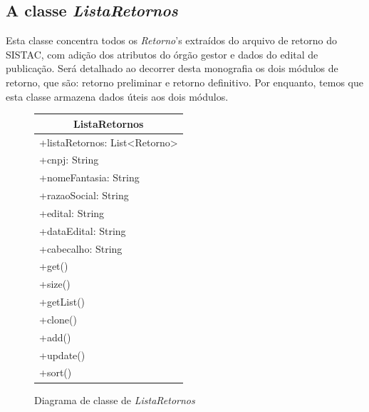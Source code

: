 \documentclass[
	12pt,			%
	openright,		%
	oneside,	
	a4paper,		%
	english,		%
	brazil			%
]{abntex2/abntex2}  %
\begin{document}
			\subsection{A classe \textit{ListaRetornos}}

				Esta classe concentra todos os \textit{Retorno}'s extraídos do arquivo de retorno do SISTAC, com adição dos atributos do órgão gestor e dados do edital de publicação. Será detalhado ao decorrer desta monografia os dois módulos de retorno, que são: retorno preliminar e retorno definitivo. Por enquanto, temos que esta classe armazena dados úteis aos dois módulos.

				\begin{figure}[h]
					\begin{center}
						
						\caption{Diagrama de classe de \textit{ListaRetornos}}
						\label{listaretornos-uml}
						
						\begin{tabular}{|l|}
							\hline
							\multicolumn{1}{|c|}{\textbf{ListaRetornos}}         \\ \hline
							+listaRetornos: List\textless{}Retorno\textgreater{} \\
							+cnpj: String                                        \\
							+nomeFantasia: String                                \\
							+razaoSocial: String                                 \\
							+edital: String                                      \\
							+dataEdital: String                                  \\
							+cabecalho: String                                   \\ \hline
							+get()                                               \\
							+size()                                              \\
							+getList()                                           \\
							+clone()                                             \\
							+add()                                               \\
							+update()                                            \\
							+sort()                                              \\ \hline
						\end{tabular}
						
					\end{center}
				\end{figure}
	
\end{document}
